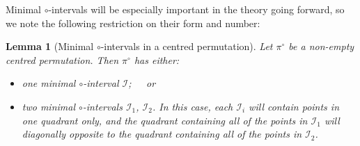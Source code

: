 \documentclass[11pt,a4paper]{article}
\newtheorem{lemma}[thm]{Lemma}
\theoremstyle{definition}
\begin{document}
Minimal $\circ$-intervals will be especially important in the theory going forward, so we note the following restriction on their form and number:

\begin{lemma}[Minimal $\circ$-intervals in a centred permutation] \label{minint}
Let $\pi^{\circ}$ be a non-empty centred permutation. Then $\pi^{\circ}$ has either:
\begin{itemize}
\item one minimal $\circ$-interval $\mathcal{I}$;\ \ \ \emph{or}
\item two minimal $\circ$-intervals $\mathcal{I}_{1}$, $\mathcal{I}_{2}$. In this case, each $\mathcal{I}_{i}$ will contain points in one quadrant only, and the quadrant containing all of the points in $\mathcal{I}_{1}$ will diagonally opposite to the quadrant containing all of the points in $\mathcal{I}_{2}$.
\end{itemize}
\end{lemma}
\end{document}
